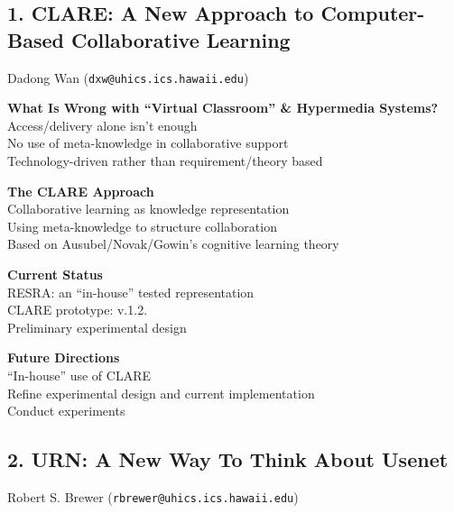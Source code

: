 
\pagestyle{empty}
      

\subsection*{1. CLARE: A New Approach to Computer-Based Collaborative Learning}
Dadong Wan  ({\tt dxw@uhics.ics.hawaii.edu})

\begin{itemizenoindent}    

\item {\bf What Is Wrong with ``Virtual Classroom'' \& Hypermedia Systems?}\\
 Access/delivery alone isn't enough\\
 No use of meta-knowledge in collaborative support\\
 Technology-driven rather than requirement/theory based\\

\item {\bf The CLARE Approach}\\
 Collaborative learning as knowledge representation\\
 Using meta-knowledge to structure collaboration\\
 Based on Ausubel/Novak/Gowin's cognitive learning theory\\

\item {\bf Current Status}\\
 RESRA: an ``in-house'' tested representation\\
 CLARE prototype: v.1.2.\\
 Preliminary experimental design\\

\item {\bf Future Directions}\\
 ``In-house'' use of CLARE\\
 Refine experimental design and current implementation\\
 Conduct experiments\\

\end{itemizenoindent}

\subsection*{2. URN: A New Way To Think About Usenet}
Robert S. Brewer ({\tt rbrewer@uhics.ics.hawaii.edu})

